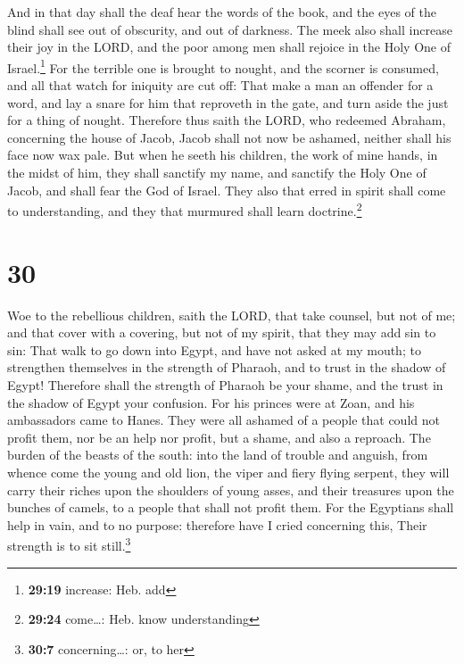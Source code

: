  And in that day shall the deaf hear the words of the
book, and the eyes of the blind shall see out of obscurity, and out of
darkness.  The meek also shall increase their joy in the
LORD, and the poor among men shall rejoice in the Holy One of
Israel.\footnote{\textbf{29:19} increase: Heb. add}  For
the terrible one is brought to nought, and the scorner is consumed, and
all that watch for iniquity are cut off:  That make a man
an offender for a word, and lay a snare for him that reproveth in the
gate, and turn aside the just for a thing of nought. 
Therefore thus saith the LORD, who redeemed Abraham, concerning the
house of Jacob, Jacob shall not now be ashamed, neither shall his face
now wax pale.  But when he seeth his children, the work
of mine hands, in the midst of him, they shall sanctify my name, and
sanctify the Holy One of Jacob, and shall fear the God of Israel.
 They also that erred in spirit shall come to
understanding, and they that murmured shall learn doctrine.\footnote{\textbf{29:24}
  come\ldots: Heb. know understanding}

\hypertarget{section-29}{%
\section{30}\label{section-29}}

 Woe to the rebellious children, saith the LORD, that take
counsel, but not of me; and that cover with a covering, but not of my
spirit, that they may add sin to sin:  That walk to go
down into Egypt, and have not asked at my mouth; to strengthen
themselves in the strength of Pharaoh, and to trust in the shadow of
Egypt!  Therefore shall the strength of Pharaoh be your
shame, and the trust in the shadow of Egypt your confusion.
 For his princes were at Zoan, and his ambassadors came to
Hanes.  They were all ashamed of a people that could not
profit them, nor be an help nor profit, but a shame, and also a
reproach.  The burden of the beasts of the south: into the
land of trouble and anguish, from whence come the young and old lion,
the viper and fiery flying serpent, they will carry their riches upon
the shoulders of young asses, and their treasures upon the bunches of
camels, to a people that shall not profit them.  For the
Egyptians shall help in vain, and to no purpose: therefore have I cried
concerning this, Their strength is to sit still.\footnote{\textbf{30:7}
  concerning\ldots: or, to her}


